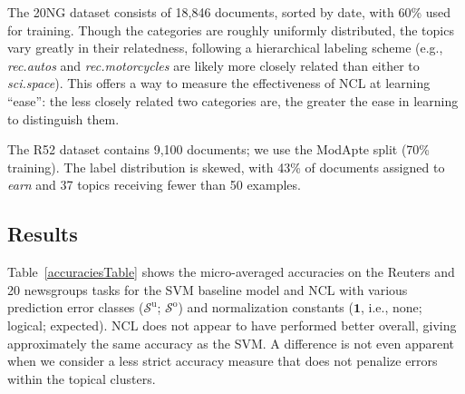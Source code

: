 \documentclass{article} %
\newcommand{\unorderedS}{\mathcal{S}^{\mathrm{u}}}
\newcommand{\orderedS}{\mathcal{S}^{\mathrm{o}}}
\newcommand{\ourmethod}{NCL}
\begin{document}
The 20NG dataset consists of 18,846 documents, sorted by date, with
60\% used for training.  Though the categories are roughly uniformly
distributed, the topics vary greatly in their relatedness, following a
hierarchical labeling scheme (e.g., \emph{rec.autos} and
\emph{rec.motorcycles} are likely more closely related than either to
\emph{sci.space}).  This offers a way to measure the effectiveness of
\ourmethod{} at learning ``ease'':   the less closely related two 
categories are, the greater the ease in learning to distinguish them.

The R52 dataset contains 9,100 documents; we use the ModApte split
(70\% training).  The label distribution is skewed, with 43\% of
documents assigned to \emph{earn} and 37 topics
receiving fewer than 50 examples.


\subsection{Results}

Table~\ref{accuraciesTable} shows the micro-averaged
accuracies on the Reuters and 20 newsgroups tasks for the 
SVM baseline model and \ourmethod{} with
various prediction error classes
($\unorderedS$; $\orderedS$) and normalization constants
($\boldsymbol{1}$, i.e., none; logical; expected).  
\ourmethod{} does not appear to have performed better overall, giving 
approximately the same accuracy as  
the SVM.  A difference is not even apparent when we consider a less
strict accuracy measure that does not penalize errors within
the topical clusters.
\end{document}
